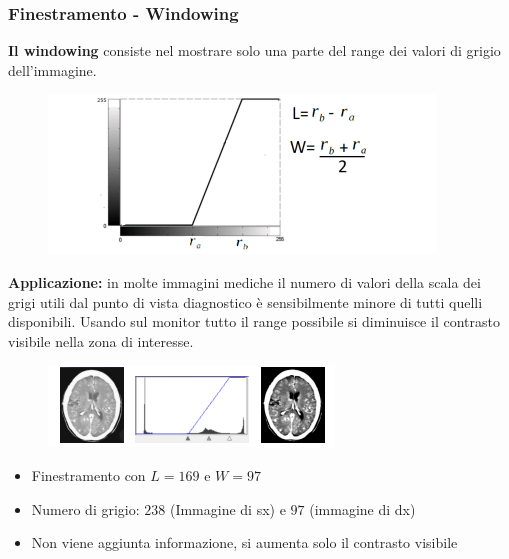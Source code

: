 \subsubsection{Finestramento - Windowing}

\begin{definition}
    \textbf{Il windowing} consiste nel mostrare solo una parte del range dei valori di grigio dell'immagine.
\end{definition}

\begin{figure}[H]
    \centering
    \includegraphics[width=\linewidth, keepaspectratio]{capitoli/immagini/imgs/win1.png}
\end{figure}

\textbf{Applicazione:} in molte immagini mediche il numero di valori della
scala dei grigi utili dal punto di vista diagnostico è sensibilmente
minore di tutti quelli disponibili. Usando sul monitor tutto il range
possibile si diminuisce il contrasto visibile nella zona di interesse.

\begin{figure}[H]
    \centering
    \includegraphics[width=\linewidth, keepaspectratio]{capitoli/immagini/imgs/windowing.png}
\end{figure}

\begin{itemize}
    \item Finestramento con $L = 169$ e $W = 97$
    \item Numero di grigio: $238$ (Immagine di sx) e $97$ (immagine di dx)
    \item Non viene aggiunta informazione, si aumenta solo il contrasto visibile
\end{itemize}

